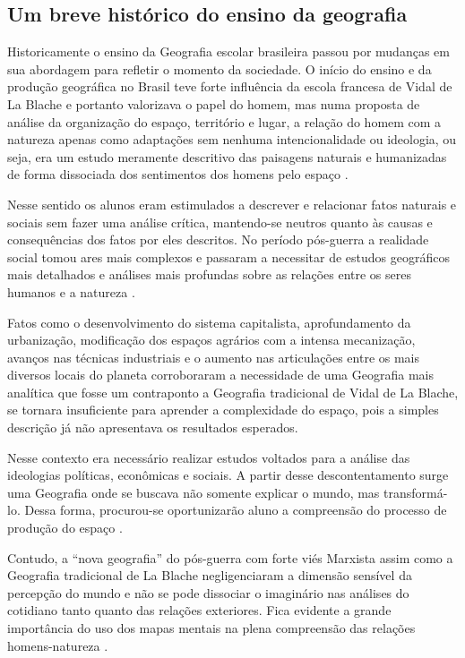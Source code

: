 \begin{refsection}
    \section{Um breve histórico do ensino da geografia}

    Historicamente o ensino da Geografia escolar brasileira passou por mudanças em sua abordagem para refletir o momento da sociedade. O início do ensino e da produção geográfica no Brasil teve forte influência da escola francesa de Vidal de La Blache e portanto valorizava o papel do homem, mas numa proposta de análise da organização do espaço, território e lugar, a relação do homem com a natureza apenas como adaptações sem nenhuma intencionalidade ou ideologia, ou seja, era um estudo meramente descritivo das paisagens naturais e humanizadas de forma dissociada dos sentimentos dos homens pelo espaço \cite{ParâmetrosCurricularesGeografia2001}. 

    Nesse sentido os alunos eram estimulados a descrever e relacionar fatos naturais e sociais sem fazer uma análise crítica, mantendo-se neutros quanto às causas e consequências dos fatos por eles descritos. No período pós-guerra a realidade social tomou ares mais complexos e passaram a necessitar de estudos geográficos mais detalhados e análises mais profundas sobre as relações entre os seres humanos e a natureza \cite{ParâmetrosCurricularesGeografia2001}.  

    Fatos como o desenvolvimento do sistema capitalista, aprofundamento da urbanização, modificação dos espaços agrários com a intensa mecanização, avanços nas técnicas industriais e o aumento nas articulações entre os mais diversos locais do planeta corroboraram a necessidade de uma Geografia mais analítica que fosse um contraponto a Geografia tradicional de Vidal de La Blache, se tornara insuficiente para aprender a complexidade do espaço, pois a simples descrição já não apresentava os resultados esperados.  

    Nesse contexto era necessário realizar estudos voltados para a análise das ideologias políticas, econômicas e sociais. A partir desse descontentamento surge uma Geografia onde se buscava não somente explicar o mundo, mas transformá-lo. Dessa forma, procurou-se oportunizarão aluno a compreensão do processo de produção do espaço \cite{ParâmetrosCurricularesGeografia2001}. 

    Contudo, a “nova geografia” do pós-guerra com forte viés Marxista assim como a Geografia tradicional de La Blache negligenciaram a dimensão sensível da percepção do mundo e não se pode dissociar o imaginário nas análises do cotidiano tanto quanto das relações exteriores. Fica evidente a grande importância do uso dos mapas mentais na plena compreensão das relações homens-natureza \cite{ParâmetrosCurricularesGeografia2001}. 


\end{refsection}
